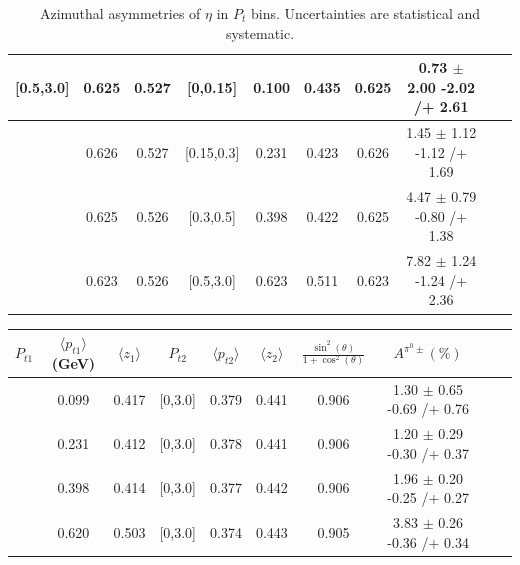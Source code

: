 \begin{table}[H]
\begin{tabular}{|c| c| c| c| c| c| c| c| c| c|}
[0.5,3.0]	&	0.625	&	0.527	&	[0,0.15]	&	0.100	&	0.435	&	0.625	&	0.73	$\pm$ 	2.00	-2.02	/+	2.61	\\ \hline
[0.5,3.0]	&	0.626	&	0.527	&	[0.15,0.3]	&	0.231	&	0.423	&	0.626	&	1.45	$\pm$ 	1.12	-1.12	/+	1.69	\\ \hline
[0.5,3.0]	&	0.625	&	0.526	&	[0.3,0.5]	&	0.398	&	0.422	&	0.625	&	4.47	$\pm$ 	0.79	-0.80	/+	1.38	\\ \hline
[0.5,3.0]	&	0.623	&	0.526	&	[0.5,3.0]	&	0.623	&	0.511	&	0.623	&	7.82	$\pm$ 	1.24	-1.24	/+	2.36	\\ \hline
\end{tabular}
\caption{Azimuthal asymmetries of $\eta$ in $P_t$ bins. Uncertainties are statistical and systematic.}
\label{tab:finaletaptbin}
\end{table}

\begin{table}[H]\scriptsize
\centering
\begin{tabular}{|c| c| c| c| c| c| c| c| c| c|}
\hline
$P_{t1}$   & $\langle  p_{t1} \rangle$(GeV) & $\langle  z_1 \rangle$& $P_{t2}$  & $\langle  p_{t2}\rangle$  &  $\langle  z_2 \rangle$  &$\frac{\sin^2(\theta)}{1+\cos^2(\theta)}$&  $A^{\pi^0\pm}(\%)$  \\ \hline
[0,0.15]	&	0.099	&	0.417	&	[0,3.0]	&	0.379	&	0.441	&	0.906	&	1.30	$\pm$ 	0.65	-0.69	/+	0.76	\\ \hline
[0.15,0.3]	&	0.231	&	0.412	&	[0,3.0]	&	0.378	&	0.441	&	0.906	&	1.20	$\pm$ 	0.29	-0.30	/+	0.37	\\ \hline
[0.3,0.5]	&	0.398	&	0.414	&	[0,3.0]	&	0.377	&	0.442	&	0.906	&	1.96	$\pm$ 	0.20	-0.25	/+	0.27	\\ \hline
[0.5,3.0]	&	0.620	&	0.503	&	[0,3.0]	&	0.374	&	0.443	&	0.905	&	3.83	$\pm$ 	0.26	-0.36	/+	0.34	\\ \hline
																				

\end{tabular}
\end{table}
